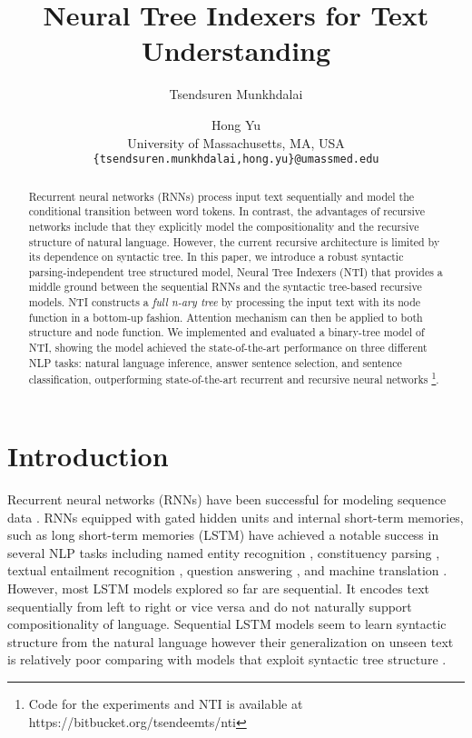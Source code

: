 \documentclass[11pt]{article}
\title{Neural Tree Indexers for Text Understanding}
\author{Tsendsuren Munkhdalai \and Hong Yu\\
        University of Massachusetts, MA, USA \\ 
        \small
        {\tt \{tsendsuren.munkhdalai,hong.yu\}@umassmed.edu}
       }
\date{}
\begin{document}
\maketitle
\begin{abstract}
Recurrent neural networks (RNNs) process input text sequentially and model the conditional transition between word tokens. In contrast, the advantages of recursive networks include that they explicitly model the compositionality and the recursive structure of natural language. However, the current recursive architecture is limited by its dependence on syntactic tree. In this paper, we introduce a robust syntactic parsing-independent tree structured model, Neural Tree Indexers (NTI) that provides a middle ground between the sequential RNNs and the syntactic tree-based recursive models. NTI constructs a \textit{full n-ary tree} by processing the input text with its node function in a bottom-up fashion. Attention mechanism can then be applied to both structure and node function. We implemented and evaluated a binary-tree model of NTI, showing the model achieved the state-of-the-art performance on three different NLP tasks: natural language inference, answer sentence selection, and sentence classification, outperforming state-of-the-art recurrent and recursive neural networks \footnote{Code for the experiments and NTI is available at https://bitbucket.org/tsendeemts/nti}. 

\end{abstract}

\section{Introduction}

Recurrent neural networks (RNNs) have been successful for modeling sequence data \cite{elman:90}. RNNs equipped with gated hidden units and internal short-term memories, such as long short-term memories (LSTM) \cite{hochreiter:97} have achieved a notable success in several NLP tasks including named entity recognition \cite{lample2016neural}, constituency parsing \cite{vinyals:15a}, textual entailment recognition \cite{rocktaschel:16}, question answering \cite{hermann:15}, and machine translation \cite{bahdanau:15}. However, most LSTM models explored so far are sequential. It encodes text sequentially from left to right or vice versa and do not naturally support compositionality of language. Sequential LSTM models seem to learn syntactic structure from the natural language however their generalization on unseen text is relatively poor comparing with models that exploit syntactic tree structure \cite{bowman2015tree}. 
\end{document}
